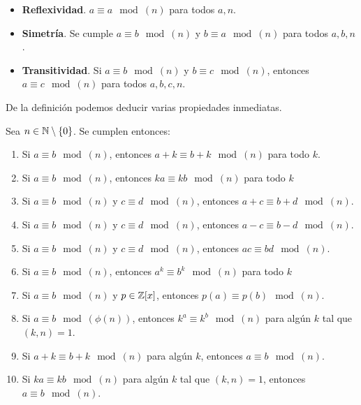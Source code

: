 \begin{itemize}
	\item \textbf{Reflexividad}. $a \equiv a \mod(n)$ para todos $a, n$.
	
	\item \textbf{Simetría}. Se cumple $a \equiv b \mod(n)$ y $b \equiv a \mod(n)$ para todos $a, b, n$.
	
	\item \textbf{Transitividad}. Si $a \equiv b \mod(n)$ y $b \equiv c \mod(n)$, entonces $a \equiv c \mod(n)$ para todos $a, b, c, n$.
\end{itemize}

De la definición podemos deducir varias propiedades inmediatas.

\begin{proposicion}
	Sea $n \in \mathbb{N} \setminus \{0\}$. Se cumplen entonces:
	
	\begin{enumerate}
		\item Si $a \equiv b \mod(n)$, entonces $a + k \equiv b + k \mod(n)$ para todo $k$.
		
		\item Si $a \equiv b \mod(n)$, entonces $ka \equiv kb \mod(n)$ para todo $k$
		
		\item Si $a \equiv b \mod(n)$ y $c \equiv d \mod(n)$, entonces $a + c \equiv b + d \mod(n)$.
		
		\item Si $a \equiv b \mod(n)$ y $c \equiv d \mod(n)$, entonces $a - c \equiv b - d \mod(n)$.
		
		\item Si $a \equiv b \mod(n)$ y $c \equiv d \mod(n)$, entonces $ac \equiv bd \mod(n)$.
		
		\item Si $a \equiv b \mod(n)$, entonces $a^k \equiv b^k \mod(n)$ para todo $k$
		
		\item Si $a \equiv b \mod(n)$ y $p \in \mathbb{Z}[x]$, entonces $p(a) \equiv p(b) \mod(n)$.
		
		\item Si $a \equiv b \mod(\phi(n))$, entonces $k^a \equiv k^b \mod(n)$ para algún $k$ tal que $(k, n) = 1$.
				
		\item Si $a + k \equiv b + k \mod(n)$ para algún $k$, entonces $a \equiv b \mod(n)$.
		
		\item Si $ka \equiv kb \mod(n)$ para algún $k$ tal que $(k, n) = 1$, entonces $a \equiv b \mod(n)$.
		

\end{enumerate}
\end{proposicion}
